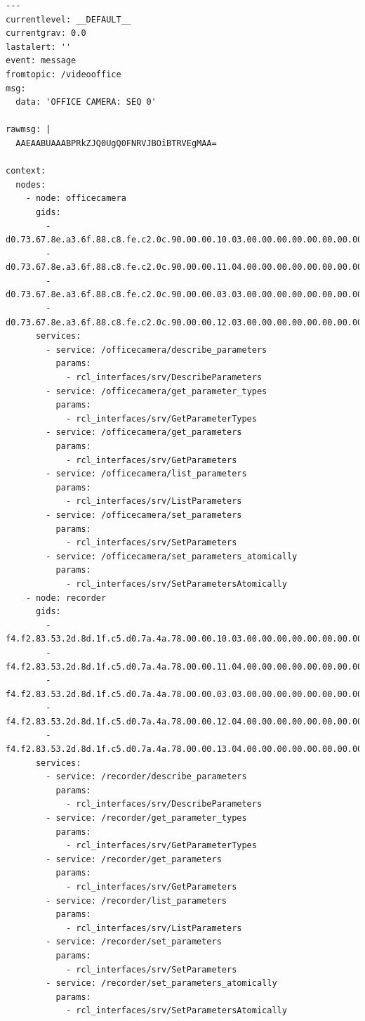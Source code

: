 \documentclass[a4paper]{article}
\begin{document}
{\scriptsize
\begin{verbatim}
---
currentlevel: __DEFAULT__
currentgrav: 0.0
lastalert: ''
event: message
fromtopic: /videooffice
msg:
  data: 'OFFICE CAMERA: SEQ 0'

rawmsg: |
  AAEAABUAAABPRkZJQ0UgQ0FNRVJBOiBTRVEgMAA=

context:
  nodes:
    - node: officecamera
      gids:
        - d0.73.67.8e.a3.6f.88.c8.fe.c2.0c.90.00.00.10.03.00.00.00.00.00.00.00.00
        - d0.73.67.8e.a3.6f.88.c8.fe.c2.0c.90.00.00.11.04.00.00.00.00.00.00.00.00
        - d0.73.67.8e.a3.6f.88.c8.fe.c2.0c.90.00.00.03.03.00.00.00.00.00.00.00.00
        - d0.73.67.8e.a3.6f.88.c8.fe.c2.0c.90.00.00.12.03.00.00.00.00.00.00.00.00
      services:
        - service: /officecamera/describe_parameters
          params:
            - rcl_interfaces/srv/DescribeParameters
        - service: /officecamera/get_parameter_types
          params:
            - rcl_interfaces/srv/GetParameterTypes
        - service: /officecamera/get_parameters
          params:
            - rcl_interfaces/srv/GetParameters
        - service: /officecamera/list_parameters
          params:
            - rcl_interfaces/srv/ListParameters
        - service: /officecamera/set_parameters
          params:
            - rcl_interfaces/srv/SetParameters
        - service: /officecamera/set_parameters_atomically
          params:
            - rcl_interfaces/srv/SetParametersAtomically
    - node: recorder
      gids:
        - f4.f2.83.53.2d.8d.1f.c5.d0.7a.4a.78.00.00.10.03.00.00.00.00.00.00.00.00
        - f4.f2.83.53.2d.8d.1f.c5.d0.7a.4a.78.00.00.11.04.00.00.00.00.00.00.00.00
        - f4.f2.83.53.2d.8d.1f.c5.d0.7a.4a.78.00.00.03.03.00.00.00.00.00.00.00.00
        - f4.f2.83.53.2d.8d.1f.c5.d0.7a.4a.78.00.00.12.04.00.00.00.00.00.00.00.00
        - f4.f2.83.53.2d.8d.1f.c5.d0.7a.4a.78.00.00.13.04.00.00.00.00.00.00.00.00
      services:
        - service: /recorder/describe_parameters
          params:
            - rcl_interfaces/srv/DescribeParameters
        - service: /recorder/get_parameter_types
          params:
            - rcl_interfaces/srv/GetParameterTypes
        - service: /recorder/get_parameters
          params:
            - rcl_interfaces/srv/GetParameters
        - service: /recorder/list_parameters
          params:
            - rcl_interfaces/srv/ListParameters
        - service: /recorder/set_parameters
          params:
            - rcl_interfaces/srv/SetParameters
        - service: /recorder/set_parameters_atomically
          params:
            - rcl_interfaces/srv/SetParametersAtomically

\end{verbatim}}
\end{document}
